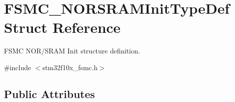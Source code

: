 \hypertarget{struct_f_s_m_c___n_o_r_s_r_a_m_init_type_def}{}\section{F\+S\+M\+C\+\_\+\+N\+O\+R\+S\+R\+A\+M\+Init\+Type\+Def Struct Reference}
\label{struct_f_s_m_c___n_o_r_s_r_a_m_init_type_def}


F\+S\+MC N\+O\+R/\+S\+R\+AM Init structure definition.  




{\ttfamily \#include $<$stm32f10x\+\_\+fsmc.\+h$>$}

\subsection*{Public Attributes}
